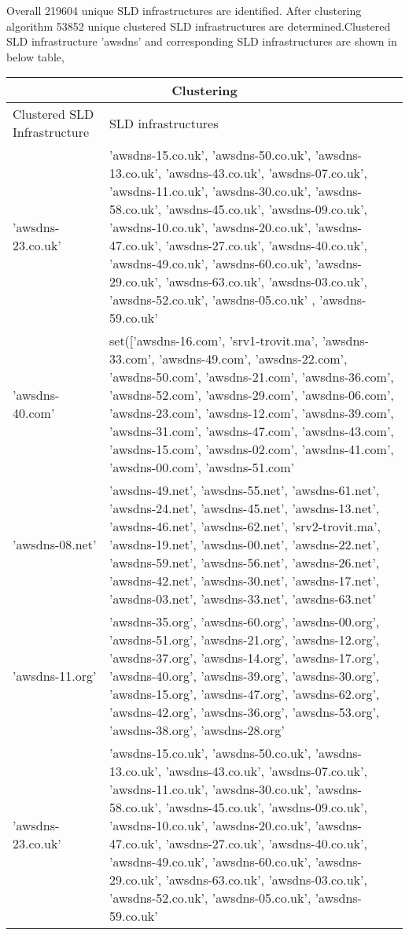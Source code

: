 Overall 219604 unique SLD infrastructures are identified. After clustering algorithm 53852 unique clustered SLD infrastructures are determined.Clustered SLD infrastructure 'awsdns' and corresponding SLD infrastructures are shown in below table,

\begin{tabular}{ |p{3cm}||p{9cm}| }
 \hline
 \multicolumn{2}{|c|}{Clustering} \\
 \hline
 Clustered SLD Infrastructure     & SLD infrastructures\\
 \hline
 'awsdns-23.co.uk' & 'awsdns-15.co.uk', 'awsdns-50.co.uk', 'awsdns-13.co.uk', 'awsdns-43.co.uk', 'awsdns-07.co.uk', 'awsdns-11.co.uk', 'awsdns-30.co.uk', 'awsdns-58.co.uk', 'awsdns-45.co.uk', 'awsdns-09.co.uk', 'awsdns-10.co.uk', 'awsdns-20.co.uk', 'awsdns-47.co.uk', 'awsdns-27.co.uk', 'awsdns-40.co.uk', 'awsdns-49.co.uk', 'awsdns-60.co.uk', 'awsdns-29.co.uk', 'awsdns-63.co.uk', 'awsdns-03.co.uk', 'awsdns-52.co.uk', 'awsdns-05.co.uk'
 , 'awsdns-59.co.uk'\\
 'awsdns-40.com' &  set(['awsdns-16.com', 'srv1-trovit.ma', 'awsdns-33.com', 'awsdns-49.com', 'awsdns-22.com', 'awsdns-50.com', 'awsdns-21.com', 'awsdns-36.com', 'awsdns-52.com', 'awsdns-29.com', 'awsdns-06.com', 'awsdns-23.com', 'awsdns-12.com', 'awsdns-39.com', 'awsdns-31.com', 'awsdns-47.com', 'awsdns-43.com', 'awsdns-15.com', 'awsdns-02.com', 'awsdns-41.com', 'awsdns-00.com', 'awsdns-51.com'\\
 'awsdns-08.net'& 'awsdns-49.net', 'awsdns-55.net', 'awsdns-61.net', 'awsdns-24.net', 'awsdns-45.net', 'awsdns-13.net', 'awsdns-46.net', 'awsdns-62.net', 'srv2-trovit.ma', 'awsdns-19.net', 'awsdns-00.net', 'awsdns-22.net', 'awsdns-59.net', 'awsdns-56.net', 'awsdns-26.net', 'awsdns-42.net', 'awsdns-30.net', 'awsdns-17.net', 'awsdns-03.net', 'awsdns-33.net', 'awsdns-63.net'\\
 'awsdns-11.org'& 'awsdns-35.org', 'awsdns-60.org', 'awsdns-00.org', 'awsdns-51.org', 'awsdns-21.org', 'awsdns-12.org', 'awsdns-37.org', 'awsdns-14.org', 'awsdns-17.org', 'awsdns-40.org', 'awsdns-39.org', 'awsdns-30.org', 'awsdns-15.org', 'awsdns-47.org', 'awsdns-62.org', 'awsdns-42.org', 'awsdns-36.org', 'awsdns-53.org', 'awsdns-38.org', 'awsdns-28.org'\\
 'awsdns-23.co.uk'& 'awsdns-15.co.uk', 'awsdns-50.co.uk', 'awsdns-13.co.uk', 'awsdns-43.co.uk', 'awsdns-07.co.uk', 'awsdns-11.co.uk', 'awsdns-30.co.uk', 'awsdns-58.co.uk', 'awsdns-45.co.uk', 'awsdns-09.co.uk', 'awsdns-10.co.uk', 'awsdns-20.co.uk', 'awsdns-47.co.uk', 'awsdns-27.co.uk', 'awsdns-40.co.uk', 'awsdns-49.co.uk', 'awsdns-60.co.uk', 'awsdns-29.co.uk', 'awsdns-63.co.uk', 'awsdns-03.co.uk', 'awsdns-52.co.uk', 'awsdns-05.co.uk', 'awsdns-59.co.uk'\\

\hline
\end{tabular}
\newline


